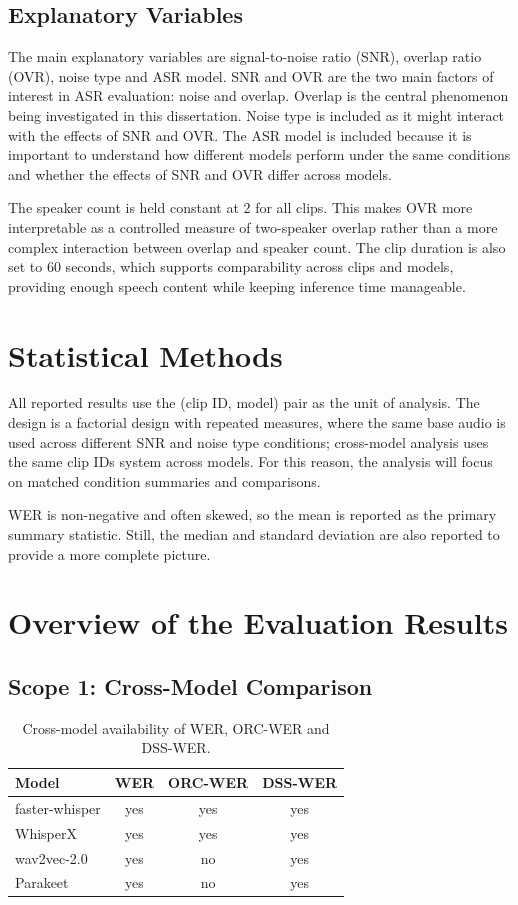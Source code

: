 \subsection{Explanatory Variables}
The main explanatory variables are signal-to-noise ratio (SNR), overlap ratio (OVR), noise type and ASR model. SNR and OVR are the two main factors of interest in ASR evaluation: noise and overlap. Overlap is the central phenomenon being investigated in this dissertation. Noise type is included as it might interact with the effects of SNR and OVR. The ASR model is included because it is important to understand how different models perform under the same conditions and whether the effects of SNR and OVR differ across models.

The speaker count is held constant at 2 for all clips. This makes OVR more interpretable as a controlled measure of two-speaker overlap rather than a more complex interaction between overlap and speaker count. The clip duration is also set to 60 seconds, which supports comparability across clips and models, providing enough speech content while keeping inference time manageable.

\section{Statistical Methods}
All reported results use the (clip ID, model) pair as the unit of analysis. The design is a factorial design with repeated measures, where the same base audio is used across different SNR and noise type conditions; cross-model analysis uses the same clip IDs system across models. For this reason, the analysis will focus on matched condition summaries and comparisons.

WER is non-negative and often skewed, so the mean is reported as the primary summary statistic. Still, the median and standard deviation are also reported to provide a more complete picture.

\section{Overview of the Evaluation Results}
\subsection{Scope 1: Cross-Model Comparison}
\label{sec:cross_model_comparison}

\begin{table}[htbp]
\label{tab:cross_model_metric_availability}
\caption{Cross-model availability of WER, ORC-WER and DSS-WER.}
\centering
\begin{tabular}{lccc}
\toprule
Model & WER & ORC-WER & DSS-WER \\
\midrule
faster-whisper & yes & yes & yes \\
WhisperX & yes & yes & yes \\
wav2vec-2.0 & yes & no & yes \\
Parakeet & yes & no & yes \\
\bottomrule
\end{tabular}
\end{table}

